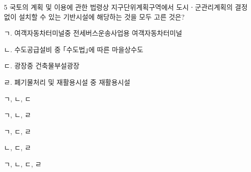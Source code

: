 \begin{question}{5}
국토의 계획 및 이용에 관한 법령상 지구단위계획구역에서 도시ㆍ군관리계획의 결정 없이 설치할 수 있는 기반시설에 해당하는 것을 모두 고른 것은?
\begin{framedtext}
ㄱ. 여객자동차터미널중 전세버스운송사업용 여객자동차터미널 \par
ㄴ. 수도공급설비 중 ｢수도법｣에 따른 마을상수도 \par
ㄷ. 광장중 건축물부설광장 \par
ㄹ. 폐기물처리 및 재활용시설 중 재활용시설
\end{framedtext}
\begin{choices}
  \item ㄱ, ㄴ, ㄷ
  \item ㄱ, ㄴ, ㄹ
  \item ㄱ, ㄷ, ㄹ
  \item ㄴ, ㄷ, ㄹ
  \item ㄱ, ㄴ, ㄷ, ㄹ
\end{choices}
\end{question}
